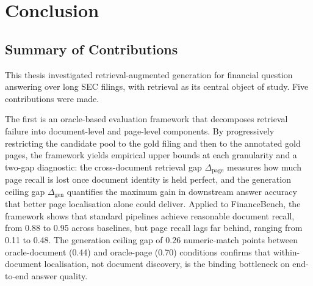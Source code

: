 \documentclass[12pt,twoside,maitrise]{dms}
\theoremstyle{definition}
\numberwithin{equation}{section}
\numberwithin{table}{chapter}
\numberwithin{figure}{chapter}
\begin{document}
\chapter{Conclusion}

\section{Summary of Contributions}

This thesis investigated retrieval-augmented generation for financial question answering
over long SEC filings, with retrieval as its central object of study. Five
contributions were made.

The first is an oracle-based evaluation framework that decomposes retrieval failure into
document-level and page-level components. By progressively restricting the candidate pool
to the gold filing and then to the annotated gold pages, the framework yields empirical upper
bounds at each granularity and a two-gap diagnostic: the cross-document retrieval gap
$\Delta_{\text{page}}$ measures how much page recall is lost once document identity is held
perfect, and the generation ceiling gap $\Delta_{\text{gen}}$ quantifies the maximum gain in
downstream answer accuracy that better page localisation alone could deliver. Applied to
FinanceBench, the framework shows that standard pipelines achieve reasonable document
recall, from 0.88 to 0.95 across baselines, but page recall lags far behind, ranging from 0.11
to 0.48. The generation ceiling gap of 0.26 numeric-match points between oracle-document
(0.44) and oracle-page (0.70) conditions confirms that within-document localisation, not
document discovery, is the binding bottleneck on end-to-end answer quality.
\end{document}
